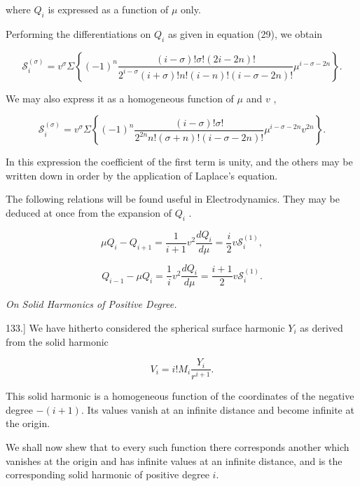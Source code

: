 \documentclass[11pt,a4paper]{article}
\begin{document}
where  $Q_i$  is expressed as a function of  $\mu$  only.

Performing the differentiations on  $Q_i$  as given in equation (29), we obtain

\begin{equation}\tag{39}
\mathcal{S}_i^{(\sigma)}=v^\sigma\Sigma\left\{(-1)^n
\frac{(i-\sigma)!\sigma!(2i-2n)!}{2^{i-\sigma}(i+\sigma)!n!(i-n)!(i-\sigma-2n)!}
\mu^{i-\sigma-2n}\right\}.
\end{equation}

We may also express it as a homogeneous function of  $\mu$  and  $v$ ,

\begin{equation}\tag{40}
\mathcal{S}_i^{(\sigma)}=v^\sigma\Sigma\left\{(-1)^n
\frac{(i-\sigma)!\sigma!}{2^{2n}n!(\sigma+n)!(i-\sigma-2n)!}
\mu^{i-\sigma-2n}v^{2n}\right\}.
\end{equation}

In this expression the coefficient of the first term is unity, and the others may be written down in order by the application of Laplace's equation.

The following relations will be found useful in Electrodynamics. They may be deduced at once from the expansion of  $Q_i$ .

\begin{equation}\tag{41}
\mu Q_i-Q_{i+1}=\frac{1}{i+1}v^2\frac{dQ_i}{d\mu}=\frac{i}{2}v\mathcal{S}_i^{(1)},
\end{equation}

\begin{equation}\tag{42}
Q_{i-1}-\mu Q_i=\frac{1}{i}v^2\frac{dQ_i}{d\mu}=\frac{i+1}{2}v\mathcal{S}_i^{(1)}.
\end{equation}

{\centering\itshape On Solid Harmonics of Positive Degree.\par}

133.] We have hitherto considered the spherical surface harmonic  $Y_i$  as derived from the solid harmonic

\[
V_i=i!M_i\frac{Y_i}{r^{i+1}}.
\]

This solid harmonic is a homogeneous function of the coordinates of the negative degree $-(i+1)$. Its values vanish at an infinite distance and become infinite at the origin.

We shall now shew that to every such function there corresponds another which vanishes at the origin and has infinite values at an infinite distance, and is the corresponding solid harmonic of positive degree $i$.
\end{document}
